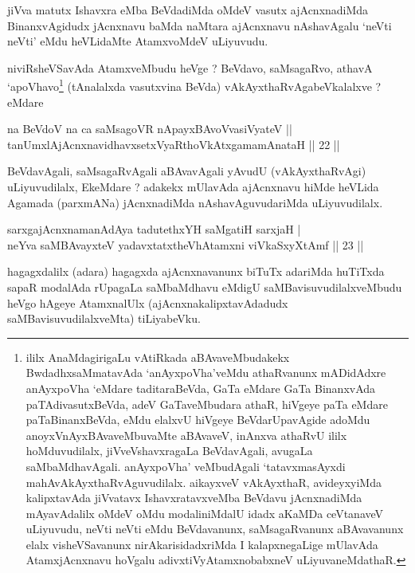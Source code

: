 \begin{artha}
jiVva matutx Ishavxra eMba BeVdadiMda oMdeV vasutx ajAcnxnadiMda BinanxvAgidudx jAcnxnavu baMda naMtara ajAcnxnavu nAshavAgalu `neVti neVti' eMdu heVLidaMte AtamxvoMdeV uLiyuvudu. 

niviRsheVSavAda AtamxveMbudu heVge ? BeVdavo, saMsagaRvo, athavA `apoVhavo\footnote{ililx AnaMdagirigaLu vAtiRkada aBAvaveMbudakekx BwdadhxsaMmatavAda `anAyxpoVha'veMdu athaRvanunx mADidAdxre anAyxpoVha `eMdare taditaraBeVda, GaTa eMdare GaTa BinanxvAda paTAdivasutxBeVda, adeV GaTaveMbudara athaR, hiVgeye paTa eMdare paTaBinanxBeVda, eMdu elalxvU hiVgeye BeVdarUpavAgide adoMdu anoyxVnAyxBAvaveMbuvaMte aBAvaveV, inAnxva athaRvU ililx hoMduvudilalx, jiVveVshavxragaLa BeVdavAgali, avugaLa saMbaMdhavAgali. anAyxpoVha' veMbudAgali `tatavxmasAyxdi mahAvAkAyxthaRvAguvudilalx. aikayxveV vAkAyxthaR, avideyxyiMda kalipxtavAda jiVvatavx IshavxratavxveMba BeVdavu jAcnxnadiMda mAyavAdalilx oMdeV oMdu modaliniMdalU idadx aKaMDa ceVtanaveV uLiyuvudu, neVti neVti eMdu BeVdavanunx, saMsagaRvanunx aBAvavanunx elalx visheVSavanunx nirAkarisidadxriMda I kalapxnegaLige mUlavAda AtamxjAcnxnavu hoVgalu adivxtiVyAtamxnobabxneV uLiyuvaneMdathaR.} (tAnalalxda vasutxvina BeVda) vAkAyxthaRvAgabeVkalalxve ? eMdare \mdash 
\end{artha}

\begin{shl}
na BeVdoV na ca saMsagoVR nApayxBAvoV\s vasiVyateV ||  \\
tanUmxlAjAcnxnavidhavxsetxVyaRthoVkAtxgamamAnataH \hfill||  22 || 
\end{shl}

\begin{artha}
BeVdavAgali, saMsagaRvAgali aBAvavAgali yAvudU (vAkAyxthaRvAgi) uLiyuvudilalx, EkeMdare ? adakekx mUlavAda ajAcnxnavu hiMde heVLida Agamada (parxmANa) jAcnxnadiMda nAshavAguvudariMda uLiyuvudilalx.
\end{artha}



\begin{shl}
sarxgajAcnxnamanAdAya tadutethxYH saMgatiH sarxjaH  | \\
neYva saMBAvayxteV yadavxtatxtheVhA\s \s tamxni viVkaSxyXtAmf \hfill||  23 ||  
\end{shl}

\begin{artha}
hagagxdalilx (adara) hagagxda ajAcnxnavanunx biTuTx adariMda huTiTxda sapaR modalAda rUpagaLa saMbaMdhavu eMdigU saMBavisuvudilalxveMbudu heVgo hAgeye AtamxnalUlx (ajAcnxnakalipxtavAdadudx saMBavisuvudilalxveMta) tiLiyabeVku.
\end{artha}

